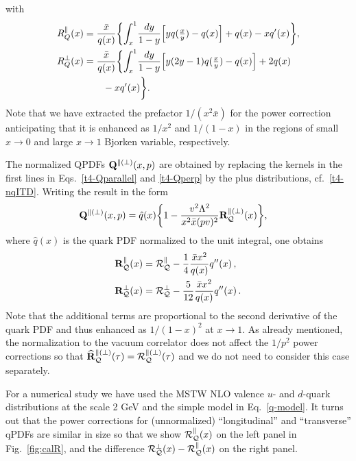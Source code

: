 with
\begin{align}
 R^\parallel_Q(x) &= 
\frac{\bar x }{q(x)} \biggl\{ \int_{x}^1\!\frac{dy}{1-y} \Big[y q(\tfrac{x}{y}) - q(x)\Big] + q(x)-x q'(x)\biggr\}, 
\notag\\
 R^\perp_Q(x) &= 
\frac{\bar x }{q(x)} \biggl\{ \int_{x}^1\!\frac{dy}{1-y} \Big[y (2y-1) q(\tfrac{x}{y}) - q(x)\Big] + 2q(x)  
\notag\\&\qquad - x q'(x) \biggr\}.
\end{align}
%
Note that we have extracted the prefactor $1/(x^2\bar x)$ for the power correction anticipating that it is 
enhanced as $1/x^2$ and $1/(1-x)$ in the regions of small $x\to 0$ and large $x\to 1$ Bjorken variable, respectively.

The normalized QPDFs $\mathbf{Q}^{\parallel(\perp)}(x,p)$ are obtained by replacing the kernels in the first lines
in Eqs.~\eqref{t4-Qparallel} and \eqref{t4-Qperp} by the plus distributions, cf.~\eqref{t4-nqITD}.
Writing the result in the form
\begin{align}
\label{bR}
   \mathbf{Q}^{\parallel(\perp)}(x,p) &=  \hat q(x) \biggl\{1 - \frac{v^2 \Lambda^2}{ x^2\bar x  (pv)^2}\mathbf{R}^{\parallel(\perp)}_{\mathcal{Q}}(x) \biggr\}, 
\end{align}
where $\hat q(x)$ is the quark PDF normalized to the unit integral, one obtains
\begin{align}
 \bR^\parallel_\cQ(x) &= \cR^\parallel_\cQ - \frac14 \frac{\bar x x^2 }{q(x)}  q''(x)\,, %
\notag\\
 \bR^\perp_\cQ(x) &= \cR^\perp_\cQ - \frac5{12} \frac{\bar x x^2 }{q(x)}  q''(x)\,.    %
\end{align}
Note that the additional terms are proportional to the second derivative of the quark PDF and thus enhanced as $1/(1-x)^2$ at $x\to 1$.
As already mentioned, the normalization to the vacuum correlator does not affect the $1/p^2$ power corrections so that 
$\widehat{\mathbf{R}}_{\mathcal{Q}}^{\parallel(\perp)}(\tau) = \mathcal{R}_{\mathcal{Q}}^{\parallel(\perp)}(\tau)$ and we do not need to consider this case separately.

For a numerical study we have used the MSTW NLO valence $u$- and $d$-quark distributions \cite{Martin:2009iq} at the scale 2 GeV and the simple model
in Eq.~\eqref{q-model}. It turns out that the power corrections for (unnormalized) ``longitudinal'' and ``transverse'' qPDFs 
are similar in size so that we show $\mathcal{R}^\parallel_{\mathcal{Q}}(x)$ on the left panel in Fig.~\ref{fig:calR}, and the difference 
$\mathcal{R}^\perp_{\mathcal{Q}}(x) - \mathcal{R}^\parallel_{\mathcal{Q}}(x)$ on the right panel.


